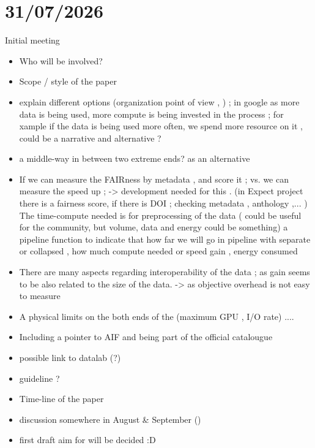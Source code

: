 \documentclass{article}
\begin{document}
\section*{31/07/2026}
Initial meeting

\begin{itemize}
    \item Who will be involved?
    \item Scope / style of the paper 

    \item explain different options  (organization point of view , ) ;  in google as more data is being used, more compute is being invested in the process ; for xample if the data is being used more often, we spend more resource on it , could be a narrative and alternative ? 

    \item a middle-way in between two extreme ends? as an alternative 
    
    \item If we can measure the FAIRness by metadata , and score it ; vs. we can measure the speed up ; -> development needed for this . (in Expect project there is a fairness score, if there is DOI ; checking metadata ,  anthology ,... ) 
    The time-compute needed is for preprocessing of the data ( could be useful for the community, but volume, data and energy could be something) 
    a pipeline function to indicate that how far we will go in pipeline with separate or collapsed , how much compute needed or speed gain , energy consumed 

    \item There are many aspects regarding interoperability of the data ; as gain seems to be also related to the size of the data. -> as objective overhead is not easy to measure 

    \item A physical limits on the both ends of the (maximum GPU ,  I/O rate) .... 
    
    \item Including a pointer to AIF and being part of the  official catalougue 

    \item possible link to datalab (?) 
    \item guideline ? 
    
    \item Time-line of the paper
    
    \item discussion somewhere in August \& September () 
    \item first draft aim for will be decided :D 
    

\end{itemize}
\end{document}
